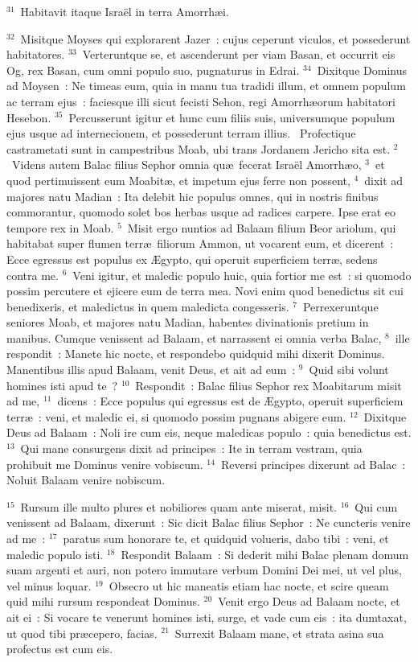 ${}^{31}$~Habitavit itaque Isra\"el in terra Amorrh\ae i.


${}^{32}$~Misitque Moyses qui explorarent Jazer~: cujus ceperunt viculos, et possederunt habitatores.
${}^{33}$~Verteruntque se, et ascenderunt per viam Basan, et occurrit eis Og, rex Basan, cum omni populo suo, pugnaturus in Edrai.
${}^{34}$~Dixitque Dominus ad Moysen~: Ne timeas eum, quia in manu tua tradidi illum, et omnem populum ac terram ejus~: faciesque illi sicut fecisti Sehon, regi Amorrh\ae orum habitatori Hesebon.
${}^{35}$~Percusserunt igitur et hunc cum filiis suis, universumque populum ejus usque ad internecionem, et possederunt terram illius.
~Profectique castrametati sunt in campestribus Moab, ubi trans Jordanem Jericho sita est.
${}^{2}$~Videns autem Balac filius Sephor omnia qu\ae\ fecerat Isra\"el Amorrh\ae o,
${}^{3}$~et quod pertimuissent eum Moabit\ae , et impetum ejus ferre non possent,
${}^{4}$~dixit ad majores natu Madian~: Ita delebit hic populus omnes, qui in nostris finibus commorantur, quomodo solet bos herbas usque ad radices carpere. Ipse erat eo tempore rex in Moab.
${}^{5}$~Misit ergo nuntios ad Balaam filium Beor ariolum, qui habitabat super flumen terr\ae\ filiorum Ammon, ut vocarent eum, et dicerent~: Ecce egressus est populus ex \AE gypto, qui operuit superficiem terr\ae , sedens contra me.
${}^{6}$~Veni igitur, et maledic populo huic, quia fortior me est~: si quomodo possim percutere et ejicere eum de terra mea. Novi enim quod benedictus sit cui benedixeris, et maledictus in quem maledicta congesseris.
${}^{7}$~Perrexeruntque seniores Moab, et majores natu Madian, habentes divinationis pretium in manibus. Cumque venissent ad Balaam, et narrassent ei omnia verba Balac,
${}^{8}$~ille respondit~: Manete hic nocte, et respondebo quidquid mihi dixerit Dominus. Manentibus illis apud Balaam, venit Deus, et ait ad eum~:
${}^{9}$~Quid sibi volunt homines isti apud te~?
${}^{10}$~Respondit~: Balac filius Sephor rex Moabitarum misit ad me,
${}^{11}$~dicens~: Ecce populus qui egressus est de \AE gypto, operuit superficiem terr\ae~: veni, et maledic ei, si quomodo possim pugnans abigere eum.
${}^{12}$~Dixitque Deus ad Balaam~: Noli ire cum eis, neque maledicas populo~: quia benedictus est.
${}^{13}$~Qui mane consurgens dixit ad principes~: Ite in terram vestram, quia prohibuit me Dominus venire vobiscum.
${}^{14}$~Reversi principes dixerunt ad Balac~: Noluit Balaam venire nobiscum.


${}^{15}$~Rursum ille multo plures et nobiliores quam ante miserat, misit.
${}^{16}$~Qui cum venissent ad Balaam, dixerunt~: Sic dicit Balac filius Sephor~: Ne cuncteris venire ad me~:
${}^{17}$~paratus sum honorare te, et quidquid volueris, dabo tibi~: veni, et maledic populo isti.
${}^{18}$~Respondit Balaam~: Si dederit mihi Balac plenam domum suam argenti et auri, non potero immutare verbum Domini Dei mei, ut vel plus, vel minus loquar.
${}^{19}$~Obsecro ut hic maneatis etiam hac nocte, et scire queam quid mihi rursum respondeat Dominus.
${}^{20}$~Venit ergo Deus ad Balaam nocte, et ait ei~: Si vocare te venerunt homines isti, surge, et vade cum eis~: ita dumtaxat, ut quod tibi pr\ae cepero, facias.
${}^{21}$~Surrexit Balaam mane, et strata asina sua profectus est cum eis.



